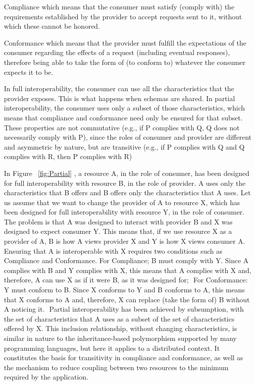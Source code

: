 Compliance\citep{compliance:def} which means that the consumer must satisfy (comply with) the requirements established
by the provider to accept requests sent to it, without which these cannot be honored.

Conformance\citep{comformance:def2} which means that the provider must fulfill the expectations of the consumer
regarding the effects of a request (including eventual responses), therefore being able to take the form
of (to conform to) whatever the consumer expects it to be. 

In full interoperability, the consumer can use all the characteristics that the provider exposes.
This is what happens when schemas are shared. In partial interoperability, the consumer uses only a subset of
those characteristics, which means that compliance and conformance need only be ensured for that subset.
These properties are not commutative (e.g., if P complies with Q, Q does not necessarily comply with P), since the
roles of consumer and provider are different and asymmetric by nature, but are transitive (e.g., if P complies with
Q and Q complies with R, then P complies with R)

In Figure ~\ref{fig:Partial} , a resource A, in the role of consumer, has been designed for full interoperability
with resource B, in the role of provider. A uses only the characteristics that B offers and B offers only the
characteristics that A uses. Let us assume that we want to change the provider of A to resource X, which has been
designed for full interoperability with resource Y, in the role of consumer. The problem is that A was designed to
interact with provider B and X was designed to expect consumer Y. This means that, if we use resource X as a
provider of A, B is how A views provider X and Y is how X views consumer A. Ensuring that A is interoperable with
X requires two conditions such as Compliance and Conformance.
For Compliance; B must comply with Y. Since A complies with B and Y complies with X, this means that A complies with
X and, therefore, A can use X as if it were B, as it was designed for; 
For Conformance: Y must conform to B. Since X conforms to Y and B conforms to A, this means that X conforms to
A and, therefore, X can replace (take the form of) B without A noticing it.  Partial interoperability has been achieved by subsumption, with the set of characteristics that A uses as a subset of the set of characteristics
offered by X. This inclusion relationship, without changing characteristics, is similar in nature to the
inheritance-based polymorphism supported by many programming languages, but here it applies to a distributed context. It constitutes the basis for transitivity in compliance and conformance, as well as the mechanism to reduce coupling between two resources to the minimum required by the application. 
